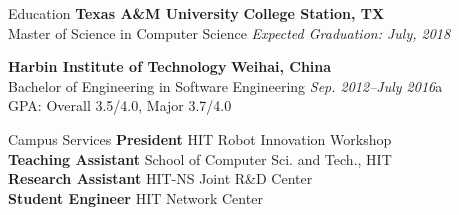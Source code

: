 \documentclass{resume} %
\begin{document}

\begin{rSection}{Education}
{\bf Texas A\&M University} \hfill {\bf College Station, TX} 
\\ Master of Science in Computer Science \hfill {\em Expected Graduation: July, 2018}

{\bf Harbin Institute of Technology} \hfill {\bf Weihai, China} 
\\ Bachelor of Engineering in Software Engineering \hfill {\em Sep. 2012--July 2016}a
\\ GPA: Overall 3.5/4.0, Major 3.7/4.0



\end{rSection}

\begin{rSection}{Campus Services}
{\bf President} \hfill {HIT Robot Innovation Workshop} 
\\{\bf Teaching Assistant} \hfill {School of Computer Sci. and Tech., HIT} 
\\{\bf Research Assistant} \hfill {HIT-NS Joint R\&D Center} 
\\{\bf Student Engineer} \hfill {HIT Network Center} 

\end{rSection}

\end{document}
